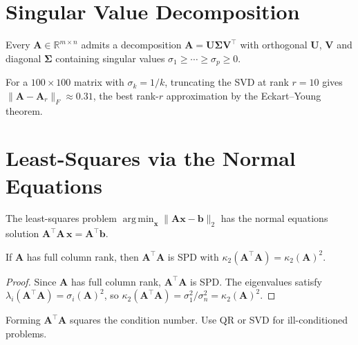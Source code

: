 \documentclass[
    language=english,
    doctype=lecture-notes,
    institution=none,
]{../../omnilatex}
\DeclareMathOperator{\argmin}{arg\,min}
\begin{document}
\section{Singular Value Decomposition}

\begin{theorem}\label{thm:svd}
Every $\mathbf{A} \in \mathbb{R}^{m \times n}$ admits a decomposition
$\mathbf{A} = \mathbf{U}\boldsymbol{\Sigma}\mathbf{V}^{\top}$ with
orthogonal $\mathbf{U}$, $\mathbf{V}$ and diagonal $\boldsymbol{\Sigma}$
containing singular values $\sigma_1 \geq \cdots \geq \sigma_p \geq 0$.
\end{theorem}

\begin{example}
For a $100 \times 100$ matrix with $\sigma_k = 1/k$, truncating the SVD at
rank $r = 10$ gives $\|\mathbf{A} - \mathbf{A}_r\|_F \approx 0.31$, the
best rank-$r$ approximation by the Eckart--Young theorem.
\end{example}

\section{Least-Squares via the Normal Equations}

The least-squares problem $\argmin_{\mathbf{x}} \|\mathbf{Ax} -
\mathbf{b}\|_2$ has the normal equations solution
$\mathbf{A}^{\top}\mathbf{A}\,\mathbf{x} = \mathbf{A}^{\top}\mathbf{b}$.

\begin{theorem}\label{thm:normal-eq}
If $\mathbf{A}$ has full column rank, then $\mathbf{A}^{\top}\mathbf{A}$ is
SPD with $\kappa_2(\mathbf{A}^{\top}\mathbf{A}) = \kappa_2(\mathbf{A})^2$.
\end{theorem}

\begin{proof}
Since $\mathbf{A}$ has full column rank, $\mathbf{A}^{\top}\mathbf{A}$ is SPD.
The eigenvalues satisfy $\lambda_i(\mathbf{A}^{\top}\mathbf{A}) =
\sigma_i(\mathbf{A})^2$, so $\kappa_2(\mathbf{A}^{\top}\mathbf{A}) =
\sigma_1^2 / \sigma_n^2 = \kappa_2(\mathbf{A})^2$.
\end{proof}

\begin{remark}
Forming $\mathbf{A}^{\top}\mathbf{A}$ squares the condition number.
Use QR or SVD for ill-conditioned problems.
\end{remark}
\end{document}
